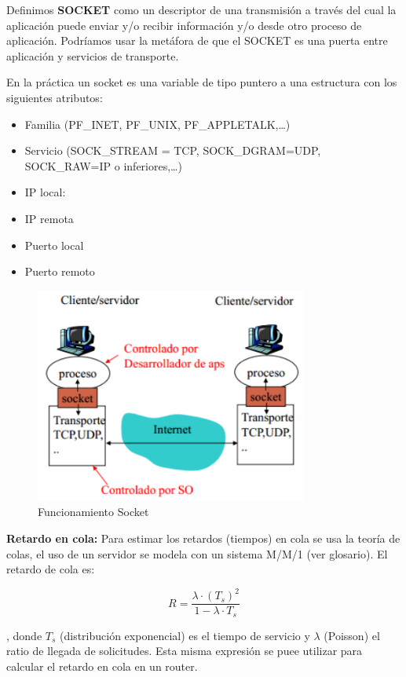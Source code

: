 \documentclass[a4paper,11pt]{article}
\begin{document}
Definimos \textbf{SOCKET} como un descriptor de una transmisión a través del cual la aplicación puede enviar y/o recibir información y/o desde otro proceso de aplicación. Podríamos usar la metáfora de que el SOCKET es una puerta entre aplicación y servicios de transporte.

En la práctica un socket es una variable de tipo puntero a una estructura con los siguientes atributos:

\begin{itemize}
\item Familia (PF\_INET, PF\_UNIX, PF\_APPLETALK,\ldots)
\item Servicio (SOCK\_STREAM = TCP, SOCK\_DGRAM=UDP, SOCK\_RAW=IP o inferiores,\ldots)
\item IP local:
\item IP remota
\item Puerto local
\item Puerto remoto
\end{itemize}

\begin{figure}[h]
\centering
\includegraphics[scale=1,width=0.8\textwidth]{sockets.png}
\caption{Funcionamiento Socket}
\end{figure}

\textbf{Retardo en cola:} Para estimar los retardos (tiempos) en cola se usa la teoría de colas, el uso de un servidor se modela con un sistema M/M/1 (ver glosario). El retardo de cola es:

\begin{equation*}
	R=\frac{\lambda \cdot (T_s)^2}{1-\lambda \cdot T_s}
\end{equation*}

, donde $T_s$ (distribución exponencial) es el tiempo de servicio y $\lambda$ (Poisson) el ratio de llegada de solicitudes. Esta misma expresión se puee utilizar para calcular el retardo en cola en un router. \\
\end{document}
